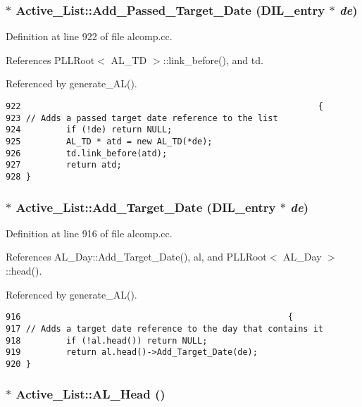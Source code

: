 \subsubsection{ $\ast$ Active\_\-List::Add\_\-Passed\_\-Target\_\-Date ({\bf DIL\_\-entry} $\ast$ {\em de})}\label{classActive__List_a14}




Definition at line 922 of file alcomp.cc.

References PLLRoot$<$ AL\_\-TD $>$::link\_\-before(), and td.

Referenced by generate\_\-AL().



\footnotesize\begin{verbatim}922                                                           {
923 // Adds a passed target date reference to the list
924         if (!de) return NULL;
925         AL_TD * atd = new AL_TD(*de);
926         td.link_before(atd);
927         return atd;
928 }
\end{verbatim}\normalsize 
{}
\subsubsection{ $\ast$ Active\_\-List::Add\_\-Target\_\-Date ({\bf DIL\_\-entry} $\ast$ {\em de})}\label{classActive__List_a13}




Definition at line 916 of file alcomp.cc.

References AL\_\-Day::Add\_\-Target\_\-Date(), al, and PLLRoot$<$ AL\_\-Day $>$::head().

Referenced by generate\_\-AL().



\footnotesize\begin{verbatim}916                                                     {
917 // Adds a target date reference to the day that contains it
918         if (!al.head()) return NULL;
919         return al.head()->Add_Target_Date(de);
920 }
\end{verbatim}\normalsize 
{}
\subsubsection{$\ast$ Active\_\-List::AL\_\-Head ()\hspace{0.3cm}{\tt  [inline]}}\label{classActive__List_a7}




